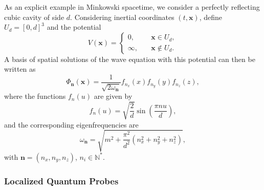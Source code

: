 \documentclass[letterpaper,12pt,titlepage,oneside,final]{book}
\begin{document}
As an explicit example in Minkowski spacetime, we consider a perfectly reflecting cubic cavity of side $d$. Considering inertial coordinates $(t,\bm x)$, define $U_d = [0,d]^3$ and the potential
\begin{equation}\label{eq:potentialCubic}
    V(\bm x) = \begin{cases}
    0, \quad & \bm x \in U_d,\\
    \infty , \quad & \bm x \notin U_d.
    \end{cases}
\end{equation}
A basis of spatial solutions of the wave equation with this potential can then be written as
\begin{equation}
    \Phi_{\bm n}(\bm x) = \frac{1}{\sqrt{2\omega_{\bm n}} }f_{n_x}(x)f_{n_y}(y)f_{n_z}(z),
\end{equation}
where the functions $f_n(u)$ are given by
\begin{equation}
    f_n(u) = \sqrt{\frac{2}{d}}\sin(\frac{\pi n u}{d}),
\end{equation}
and the corresponding eigenfrequencies are
\begin{equation}\label{eq:gapBox}
    \omega_{\bm n} = \sqrt{m^2 + \frac{\pi^2}{d^2}(n_x^2 + n_y^2 + n_z^2)},
\end{equation}
with $\bm n = (n_x,n_y,n_z)$, $n_i \in \mathbb{N}^*$.


\subsubsection*{Localized Quantum Probes}
\end{document}
